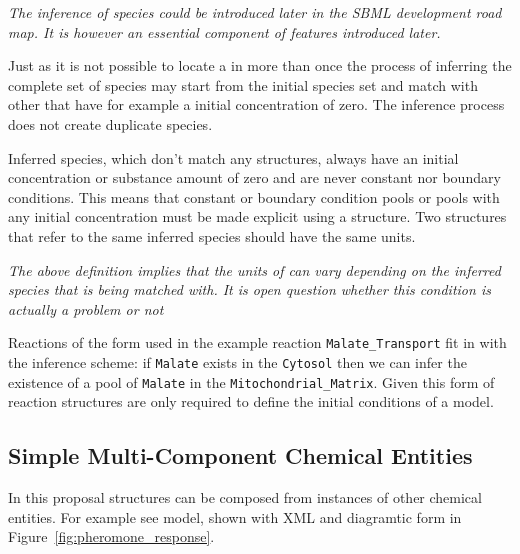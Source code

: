 \documentclass{cekarticle}
\begin{document}
\emph{The inference of species could be introduced later in the SBML development road map.
It is however an essential component of features introduced later.}

Just as it is not possible to locate a  in  more than
once the process of inferring the complete set of species may start from the initial species
set and match with other  that have for example a initial concentration of zero.
The inference process does not create duplicate species.

Inferred species, which don't match any  structures, always have an initial
concentration or substance amount of zero and are never
constant nor boundary conditions.  This means that constant or boundary condition pools or pools
with any initial concentration must be made explicit using a  structure.
Two 
 structures that refer to the same inferred species should have
the same units.

\emph{The above definition implies that the units of  can vary
depending on the inferred species that is being matched with.  It is open question whether this
condition is actually a problem or not}

Reactions of the form used in the example reaction \texttt{Malate\_Transport} fit in with the
inference scheme: if \texttt{Malate} exists in the
\texttt{Cytosol} then we can infer the existence of a pool of \texttt{Malate} in the
\texttt{Mitochondrial\_Matrix}.  Given this form of reaction  structures are only
required to define the initial conditions of a model.

\subsection{Simple Multi-Component Chemical Entities}
\label{sec:multicomponentspecies}

In this proposal  structures can be composed from instances of other chemical
entities.  For example see model, shown with XML and diagramtic form in
Figure~\ref{fig:pheromone_response}.
\end{document}
